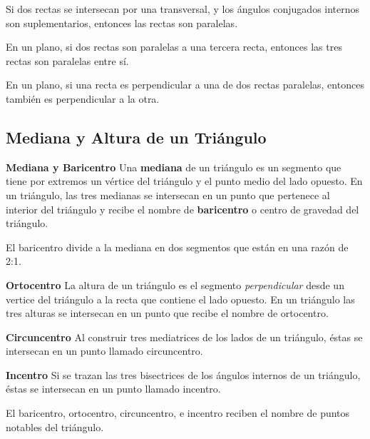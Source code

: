 \begin{theorem}
    Si dos rectas se intersecan por una transversal, y los ángulos conjugados internos son suplementarios, entonces las rectas son paralelas.
\end{theorem}

\begin{theorem}
    En un plano, si dos rectas son paralelas a una tercera recta, entonces las tres rectas son paralelas entre sí.
\end{theorem}

\begin{theorem}
    En un plano, si una recta es perpendicular a una de dos rectas paralelas, entonces también es perpendicular a la otra.
\end{theorem}

\subsection{Mediana y Altura de un Triángulo}

\begin{definition}{\textbf{Mediana y Baricentro}}
    Una \textbf{mediana} de un triángulo es un segmento que tiene por extremos un vértice del triángulo  y el punto medio del lado opuesto. En un triángulo, las tres medianas se intersecan en un punto que pertenece al interior del triángulo y recibe el nombre de \textbf{baricentro} o centro de gravedad del triángulo.
\end{definition}

\begin{theorem}
    El baricentro divide a la mediana en dos segmentos que están en una razón de 2:1.
\end{theorem}

\begin{definition}{\textbf{Ortocentro}}
    La altura de un triángulo es el segmento \textit{perpendicular} desde un vertice del triángulo a la recta que contiene el lado opuesto. En un triángulo las tres alturas se intersecan en un punto que recibe el nombre de ortocentro.
\end{definition}

\begin{definition}{\textbf{Circuncentro}}
    Al construir tres mediatrices de los lados de un triángulo, éstas se intersecan en un punto llamado circuncentro.
\end{definition}

\begin{definition}{\textbf{Incentro}}
    Si se trazan las tres bisectrices de los ángulos internos de un triángulo, éstas se intersecan en un punto llamado incentro.
\end{definition}

\begin{definition}
    El baricentro, ortocentro, circuncentro, e incentro reciben el nombre de puntos notables del triángulo.    
\end{definition}

